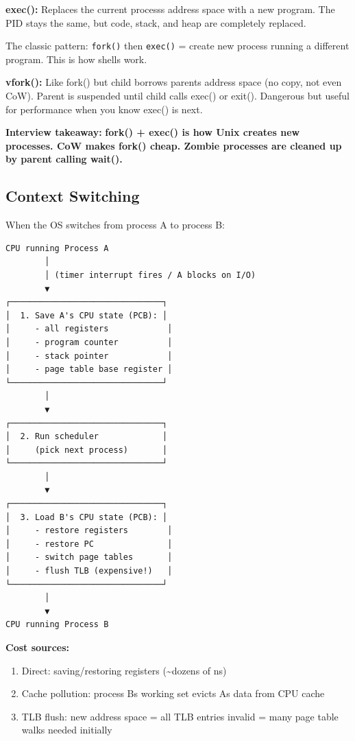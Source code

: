 \documentclass[11pt]{article}
\providecommand{\tightlist}{\setlength{\itemsep}{1pt}\setlength{\parskip}{0pt}}
\begin{document}
\textbf{exec():} Replaces the current process\textquotesingle s address space with a new program. The PID stays the same, but code, stack, and heap are completely replaced.

The classic pattern: \texttt{fork()} then \texttt{exec()} = create new process running a different program. This is how shells work.

\textbf{vfork():} Like fork() but child borrows parent\textquotesingle s address space (no copy, not even CoW). Parent is suspended until child calls exec() or exit(). Dangerous but useful for performance when you know exec() is next.

\textbf{Interview takeaway:} \textbf{fork() + exec() is how Unix creates new processes. CoW makes fork() cheap. Zombie processes are cleaned up by parent calling wait().}

\subsection{Context Switching}\label{context-switching}

When the OS switches from process A to process B:

\setcodelang{}

\begin{verbatim}
CPU running Process A
        │
        │ (timer interrupt fires / A blocks on I/O)
        ▼
┌───────────────────────────────┐
│  1. Save A's CPU state (PCB): │
│     - all registers            │
│     - program counter          │
│     - stack pointer            │
│     - page table base register │
└───────────────────────────────┘
        │
        ▼
┌───────────────────────────────┐
│  2. Run scheduler             │
│     (pick next process)       │
└───────────────────────────────┘
        │
        ▼
┌───────────────────────────────┐
│  3. Load B's CPU state (PCB): │
│     - restore registers        │
│     - restore PC               │
│     - switch page tables       │
│     - flush TLB (expensive!)   │
└───────────────────────────────┘
        │
        ▼
CPU running Process B
\end{verbatim}

\textbf{Cost sources:}

\begin{enumerate}
\def\labelenumi{\arabic{enumi}.}
\tightlist
\item
  Direct: saving/restoring registers (\textasciitilde dozens of ns)
\item
  Cache pollution: process B\textquotesingle s working set evicts A\textquotesingle s data from CPU cache
\item
  TLB flush: new address space = all TLB entries invalid = many page table walks needed initially
\end{enumerate}
\end{document}
